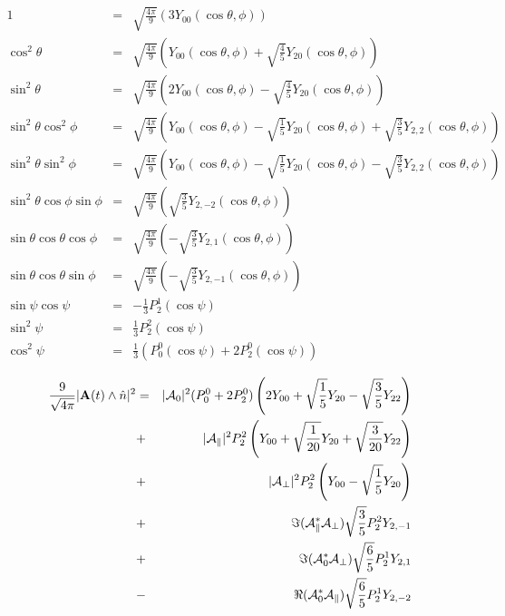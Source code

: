 \documentclass[a4paper,9pt,twoside]{article}
\begin{document}
\begin{eqnarray}
  1                       &=& \sqrt{ \frac{4\pi}{9} } \left( 3 Y_{00}(\cos\theta,\phi) \right) \\
  \cos^2\theta            &=& \sqrt{ \frac{4\pi}{9} } \left( Y_{00}(\cos\theta,\phi) + \sqrt{\frac{4}{5}}Y_{20}(\cos\theta,\phi)\right)\\
  \sin^2\theta            &=& \sqrt{ \frac{4\pi}{9} } \left( 2Y_{00}(\cos\theta,\phi) - \sqrt{\frac{4}{5}}Y_{20}(\cos\theta,\phi)\right)\\
  \sin^2\theta \cos^2\phi &=& \sqrt{ \frac{4\pi}{9} } \left( Y_{00}(\cos\theta,\phi) - \sqrt{\frac{1}{5} }Y_{20}(\cos\theta,\phi) +\sqrt{\frac{3}{5}} Y_{2,2}(\cos\theta,\phi)\right) \\
  \sin^2\theta \sin^2\phi &=& \sqrt{ \frac{4\pi}{9} } \left( Y_{00}(\cos\theta,\phi) - \sqrt{\frac{1}{5} }Y_{20}(\cos\theta,\phi) -\sqrt{\frac{3}{5}} Y_{2,2}(\cos\theta,\phi)\right) \\
  \sin^2\theta\cos\phi\sin\phi &=& \sqrt{ \frac{4\pi}{9}} \left(\sqrt{\frac{3}{5}} Y_{2,-2}(\cos\theta,\phi) \right) \\
  \sin\theta\cos\theta\cos\phi &=& \sqrt{ \frac{4\pi}{9}}\left( -\sqrt{\frac{3}{5}}Y_{2,1}(\cos\theta,\phi)\right) \\ 
  \sin\theta\cos\theta\sin\phi &=& \sqrt{ \frac{4\pi}{9}}\left( -\sqrt{\frac{3}{5}}Y_{2,-1}(\cos\theta,\phi) \right) \\
  \sin\psi\cos\psi &=& -\frac{1}{3} P_2^1(\cos\psi) \\
  \sin^2 \psi      &=&  \frac{1}{3} P_2^2(\cos\psi) \\
  \cos^2 \psi      &=&  \frac{1}{3} \left( P_0^0(\cos\psi)+2P_2^0(\cos\psi) \right)
\end{eqnarray}

\begin{eqnarray}
\frac{9 }{\sqrt{4\pi}} |{ \bf A}(t) \wedge \hat{n}|^2 
                              &=&|{\cal A}_0|^2  (P_0^0+2P_2^0 ) \left( 2 Y_{00}+\sqrt{\frac{1}{5}}Y_{20}-\sqrt{\frac{3}{5}}Y_{22} \right) \\
                              &+&|{\cal A}_\parallel|^2 P_2^2 \left( Y_{00}+\sqrt{\frac{1}{20}}Y_{20}+\sqrt{\frac{3}{20}}Y_{22}  \right)  \\
                              &+&|{\cal A}_\perp|^2  P_2^2 \left( Y_{00} - \sqrt{\frac{1}{5}}Y_{20}\right)\\
                              &+&\Im({\cal A}_\parallel^*{\cal A}_\perp) \sqrt{\frac{3}{5}}P_2^2 Y_{2,-1}  \\
                              &+&\Im({\cal A}_0^* {\cal A}_\perp )       \sqrt{\frac{6}{5}}P_2^1Y_{2,1} \\
                              &-&\Re({\cal A}_0^*{\cal A}_\parallel  )   \sqrt{\frac{6}{5}}P_2^1 Y_{2,-2} 
\end{eqnarray}
\end{document}
